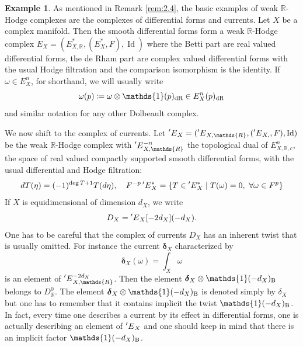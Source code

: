 \documentclass[11pt,a4paper]{amsart}
\newcommand{\Betti}{\text{\rm B}}
\newcommand{\dR}{\text{\rm dR}}
\newcommand{\R}{\mathds{R}}
\newcommand{\bfone}{{\mathds{1}}}
\newcommand{\bfdelta}{{\boldsymbol{\delta}}}
\DeclareMathOperator{\Id}{Id}
\numberwithin{equation}{section}
\theoremstyle{plain}
\theoremstyle{definition}
\newtheorem{ex}[prop]{Example}
\begin{document}
\begin{ex}\label{exm:9} As mentioned in Remark \ref{rem:2.4}, the
  basic examples of weak $\R$-Hodge 
  complexes are the complexes of differential forms and currents. Let
  $X$ be a complex manifold. Then the smooth differential forms form a
  weak $\R$-Hodge complex $E_{X}=(E^{\ast}_{X,\R},(E^{\ast}_{X},F),\Id)$ where the Betti
  part are real valued differential forms, the de Rham part are
  complex valued differential forms with the usual Hodge filtration
  and the comparison isomorphism is the identity.
  If $\omega \in E^{n}_{X}$, for shorthand, we will usually write 
  \begin{displaymath}
    \omega (p)\coloneqq \omega \otimes \bfone(p)_{\dR}\in E^{n}_{X}(p)_{\dR} 
  \end{displaymath}
  and similar notation for any other Dolbeault complex.

  We now shift to the complex of currents. Let
  $\prescript{\prime}{}{E}_{X}=(\prescript{\prime}{}{E}_{X,\R},
  (\prescript{\prime}{}{E}_{X,},F),\Id)$  be the weak $\R$-Hodge complex
  with $\prescript{\prime}{}{E}^{-n}_{X,\R}$ the topological dual of
  $E^{n}_{X,\R,c}$, the space of real valued compactly supported
  smooth differential forms, with the usual differential and Hodge
  filtration:
  \begin{displaymath}
    d T(\eta)=(-1)^{\deg T+1}T(d\eta), \quad
    F^{-p}\prescript{\prime}{}{E}^{\ast}_{X}=\{T\in
    \prescript{\prime}{}{E}^{\ast}_{X}\mid T(\omega 
    )=0,\ \forall \omega \in F^{p}\}
  \end{displaymath}
  If $X$ is equidimensional of dimension $d_{X}$, we write
  \begin{displaymath}
    D_{X}=\prescript{\prime}{}{E}_{X}[-2d_{X}](-d_{X}).
  \end{displaymath}
  One has to be careful that the complex of currents $D_{X}$ has an
  inherent twist that is usually omitted.
  For instance the current $\bfdelta _{X}$ characterized by
  \begin{displaymath}
    \bfdelta _{X}(\omega )=\int_{X}\omega 
  \end{displaymath}
  is an element of $\prescript{\prime}{}{E}^{-2d_{X}}_{X,\R}$. Then the
  element $\bfdelta _{X}\otimes \bfone(-d_{X})_{\Betti}$ belongs to
  $D^{0}_{\R}$. The element $\bfdelta _{X}\otimes
  \bfone(-d_{X})_{\Betti}$ is denoted simply by $\delta _{X}$ but one has
  to remember that it contains implicit the twist $\bfone(-d_{X})_{\Betti}$. In
  fact, every time one describes a current by its effect in
  differential forms, one is actually describing an element of
  $\prescript{\prime}{}{E}_{X}$ and one should keep in mind that there
  is an implicit factor $\bfone(-d_{X})_{\Betti}$.


\end{ex}
\end{document}
